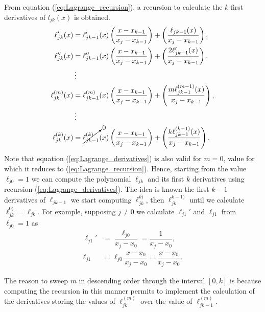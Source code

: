     From equation (\ref{eq:Lagrange_recursion}). a recursion to calculate the $k$ first derivatives of $l_{jk}(x)$ is obtained.
    \begin{align}
    	\ell_{jk}'(x) 
    	&
    	= 
    	\ell_{jk-1}'(x)  
    	\left(
    	\dfrac{x - x_{k-1}}{x_j - x_{k-1}}
    	\right)
    	+
    	\left(
    	\dfrac{\ell_{jk-1}(x)}{x_j - x_{k-1}}
    	\right),
    	\nonumber
    	\\
    	\ell_{jk}''(x) 
    	&
    	= 
    	\ell_{jk-1}''(x)  
    	\left(
    	\dfrac{x - x_{k-1}}{x_j - x_{k-1}}
    	\right)
    	+
    	\left(
    	\dfrac{2\ell_{jk-1}'(x)}{x_j - x_{k-1}}
    	\right),
    	\nonumber
    	\\& \vdots \nonumber
    	\\
    	\ell_{jk}^{(m)}(x) 
    	&
    	= 
    	\ell_{jk-1}^{(m)}(x)  
    	\left(
    	\dfrac{x - x_{k-1}}{x_j - x_{k-1}}
    	\right)
    	+
    	\left(
    	\dfrac{m\ell_{jk-1}^{(m-1)}(x)}{x_j - x_{k-1}}
    	\right),
    	\label{eq:Lagrange_derivatives}
    	\\& \vdots \nonumber
    	\\
    	\ell_{jk}^{(k)}(x) 
    	&
    	= 
    	\cancelto{0}{\ell_{jk-1}^{(k)}}(x)
    	\left(
    	\dfrac{x - x_{k-1}}{x_j - x_{k-1}}
    	\right)
    	+
    	\left(
    	\dfrac{k\ell_{jk-1}^{(k-1)}(x)}{x_j - x_{k-1}}
    	\right).
    	\nonumber
    \end{align}
    Note that equation (\ref{eq:Lagrange_derivatives}) is also valid for $m=0$, value for which it reduces to (\ref{eq:Lagrange_recursion}). Hence, starting from the value $\ell_{j0}=1$ we can compute the polynomial $\ell_{jk}$ and its first $k$ derivatives using recursion (\ref{eq:Lagrange_derivatives}). The idea is known the first $k-1$ derivatives of $\ell_{jk-1}$ we start computing $\ell_{jk}^{k)}$, then $\ell_{jk}^{k-1)}$ until we calculate $\ell_{jk}^{0)}=\ell_{jk}$. For example, supposing $j\neq 0$ we calculate $\ell_{j1}'$ and $\ell_{j1}$ from $\ell_{j0}=1$ as
    \begin{align*}
    	\ell_{j1}' 
    	& 
    	= \dfrac{\ell_{j0}}{x_j - x_0} = \dfrac{1}{x_j - x_0},
    	\\
    	\ell_{j1} 
    	& 
    	=\ell_{j0}\dfrac{x-x_0}{x_j - x_0}
    	= \dfrac{x-x_0}{x_j - x_0}.
    \end{align*}
    
    The reason to sweep $m$ in descending order through the interval $[0,k]$ is because computing the recursion in this manner permits to implement the calculation of the derivatives storing the values of $\ell_{jk}^{(m)}$ over the value of $\ell_{jk-1}^{(m)}$. 
    
